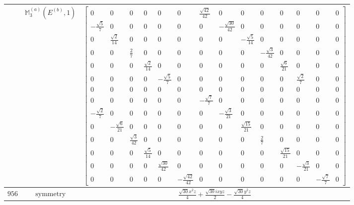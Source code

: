 \documentclass[fleqn,8pt,landscape]{jsarticle}
\begin{document}
\begin{longtable}{ccc}
$  $ & $ \mathbb{M}_{3}^{(a)}(E^{(b)},1) $ & $ \begin{bmatrix} 0 & 0 & 0 & 0 & 0 & 0 & \frac{\sqrt{42}}{42} & 0 & 0 & 0 & 0 & 0 & 0 & 0 \\ - \frac{\sqrt{5}}{7} & 0 & 0 & 0 & 0 & 0 & 0 & - \frac{\sqrt{30}}{42} & 0 & 0 & 0 & 0 & 0 & 0 \\ 0 & \frac{\sqrt{2}}{14} & 0 & 0 & 0 & 0 & 0 & 0 & - \frac{\sqrt{5}}{14} & 0 & 0 & 0 & 0 & 0 \\ 0 & 0 & \frac{2}{7} & 0 & 0 & 0 & 0 & 0 & 0 & - \frac{\sqrt{3}}{42} & 0 & 0 & 0 & 0 \\ 0 & 0 & 0 & \frac{\sqrt{2}}{14} & 0 & 0 & 0 & 0 & 0 & 0 & \frac{\sqrt{6}}{21} & 0 & 0 & 0 \\ 0 & 0 & 0 & 0 & - \frac{\sqrt{5}}{7} & 0 & 0 & 0 & 0 & 0 & 0 & \frac{\sqrt{2}}{7} & 0 & 0 \\ 0 & 0 & 0 & 0 & 0 & 0 & 0 & 0 & 0 & 0 & 0 & 0 & 0 & 0 \\ 0 & 0 & 0 & 0 & 0 & 0 & - \frac{\sqrt{7}}{7} & 0 & 0 & 0 & 0 & 0 & 0 & 0 \\ - \frac{\sqrt{2}}{7} & 0 & 0 & 0 & 0 & 0 & 0 & - \frac{\sqrt{3}}{21} & 0 & 0 & 0 & 0 & 0 & 0 \\ 0 & - \frac{\sqrt{6}}{21} & 0 & 0 & 0 & 0 & 0 & 0 & \frac{\sqrt{15}}{21} & 0 & 0 & 0 & 0 & 0 \\ 0 & 0 & \frac{\sqrt{3}}{42} & 0 & 0 & 0 & 0 & 0 & 0 & \frac{2}{7} & 0 & 0 & 0 & 0 \\ 0 & 0 & 0 & \frac{\sqrt{5}}{14} & 0 & 0 & 0 & 0 & 0 & 0 & \frac{\sqrt{15}}{21} & 0 & 0 & 0 \\ 0 & 0 & 0 & 0 & \frac{\sqrt{30}}{42} & 0 & 0 & 0 & 0 & 0 & 0 & - \frac{\sqrt{3}}{21} & 0 & 0 \\ 0 & 0 & 0 & 0 & 0 & - \frac{\sqrt{42}}{42} & 0 & 0 & 0 & 0 & 0 & 0 & - \frac{\sqrt{7}}{7} & 0 \end{bmatrix} $ \\ \hline
$ 956 $ & $ \text{symmetry} $ & $ \frac{\sqrt{30} x^{2} z}{4} + \frac{\sqrt{30} i x y z}{2} - \frac{\sqrt{30} y^{2} z}{4} $ \\

\end{longtable}
\end{document}
